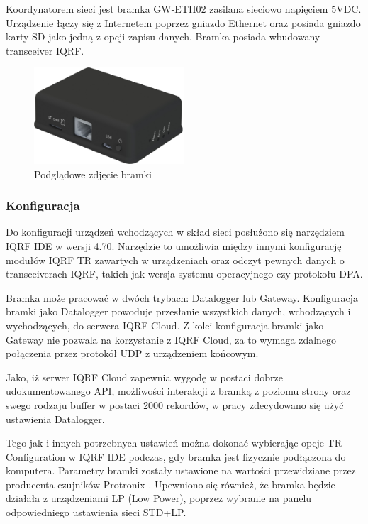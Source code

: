 Koordynatorem sieci jest bramka GW-ETH02 zasilana sieciowo napięciem 5VDC. Urządzenie łączy się z Internetem poprzez gniazdo Ethernet oraz
posiada gniazdo karty SD jako jedną z opcji zapisu danych. Bramka posiada wbudowany transceiver IQRF.

\begin{figure}[H]
    \centering
    \includegraphics[width=0.5\textwidth]{zdj/gateway.png}
    \caption{Podglądowe zdjęcie bramki \cite{gateway-product}}
\end{figure}

\subsubsection{Konfiguracja}

Do konfiguracji urządzeń wchodzących w skład sieci posłużono się narzędziem IQRF IDE w wersji 4.70. Narzędzie to umożliwia między 
innymi konfigurację modułów IQRF TR zawartych w urządzeniach oraz odczyt pewnych danych o transceiverach IQRF, takich jak wersja systemu
operacyjnego czy protokołu DPA.

Bramka może pracować w dwóch trybach: Datalogger lub Gateway. Konfiguracja bramki jako Datalogger powoduje przesłanie wszystkich danych,
wchodzących i wychodzących, do serwera IQRF Cloud. Z kolei konfiguracja bramki jako Gateway nie pozwala na korzystanie z IQRF Cloud, za to wymaga 
zdalnego połączenia przez protokół UDP z urządzeniem końcowym.

Jako, iż serwer IQRF Cloud zapewnia wygodę w postaci dobrze udokumentowanego API, możliwości interakcji z bramką z poziomu strony oraz swego
rodzaju buffer w postaci 2000 rekordów, w pracy zdecydowano się użyć ustawienia Datalogger.

Tego jak i innych potrzebnych ustawień można dokonać wybierając opcje TR Configuration w IQRF IDE podczas, gdy bramka jest fizycznie podłączona
do komputera. Parametry bramki zostały ustawione na wartości przewidziane przez producenta czujników Protronix \cite{protronix-comms}. Upewniono 
się również, że bramka będzie działała z urządzeniami LP (Low Power), poprzez wybranie na panelu odpowiedniego ustawienia sieci STD+LP.

